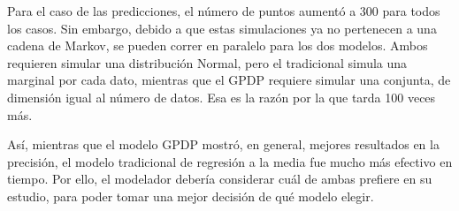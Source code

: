 Para el caso de las predicciones, el n\'umero de puntos aument\'o a 300 para todos los casos. Sin embargo, debido a que estas simulaciones ya no pertenecen a una cadena de Markov, se pueden correr en paralelo para los dos modelos. Ambos requieren simular una distribuci\'on Normal, pero el tradicional simula una marginal por cada dato, mientras que el GPDP requiere simular una conjunta, de dimensi\'on igual al n\'umero de datos. Esa es la raz\'on por la que tarda 100 veces m\'as.

As\'i, mientras que el modelo GPDP mostr\'o, en general, mejores resultados en la precisi\'on, el modelo tradicional de regresi\'on a la media fue mucho m\'as efectivo en tiempo. Por ello, el modelador deber\'ia considerar cu\'al de ambas prefiere en su estudio, para poder tomar una mejor decisi\'on de qu\'e modelo elegir.


\newpage